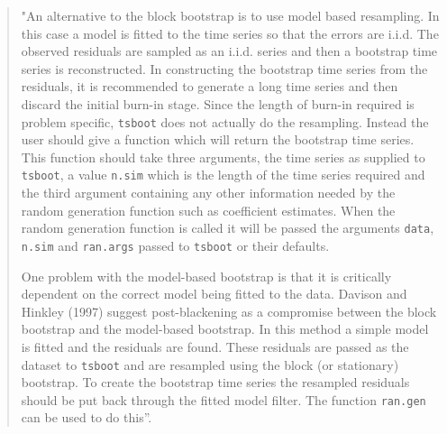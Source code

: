 \documentclass[
]{book}
\theoremstyle{definition}
\theoremstyle{definition}
\theoremstyle{definition}
\theoremstyle{remark}
\begin{document}
\begin{quote}
"An alternative to the block bootstrap is to use
model based resampling. In this case a model is fitted
to the time series so that the errors are i.i.d. The
observed residuals are sampled as an i.i.d. series and
then a bootstrap time series is reconstructed. In constructing
the bootstrap time series from the residuals,
it is recommended to generate a long time series
and then discard the initial burn-in stage. Since
the length of burn-in required is problem specific,
\texttt{tsboot} does not actually do the resampling. Instead
the user should give a function which will return the
bootstrap time series. This function should take three
arguments, the time series as supplied to \texttt{tsboot}, a
value \texttt{n.sim} which is the length of the time series required
and the third argument containing any other
information needed by the random generation function
such as coefficient estimates. When the random
generation function is called it will be passed the arguments
\texttt{data}, \texttt{n.sim} and \texttt{ran.args} passed to \texttt{tsboot}
or their defaults.

One problem with the model-based bootstrap is
that it is critically dependent on the correct model
being fitted to the data. Davison and Hinkley (1997)
suggest post-blackening as a compromise between the
block bootstrap and the model-based bootstrap. In
this method a simple model is fitted and the residuals
are found. These residuals are passed as the dataset
to \texttt{tsboot} and are resampled using the block (or stationary)
bootstrap. To create the bootstrap time series
the resampled residuals should be put back through
the fitted model filter. The function \texttt{ran.gen} can be
used to do this''.
\end{quote}
\end{document}
